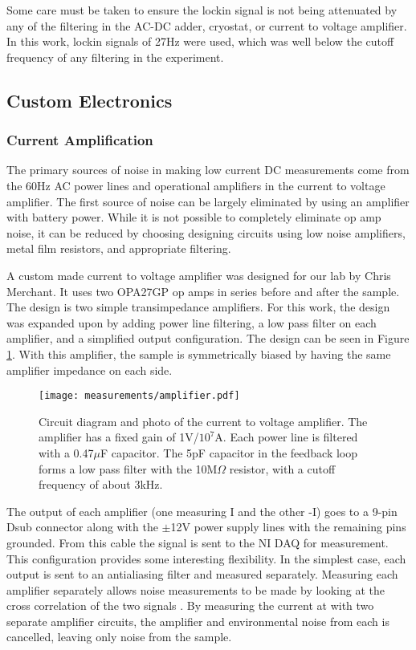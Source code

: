 Some care must be taken to ensure the lockin signal is not being attenuated by any of the filtering in the AC-DC adder, cryostat, or current to voltage amplifier.  In this work, lockin signals of 27Hz were used, which was well below the cutoff frequency of any filtering in the experiment.

\subsection{Custom Electronics}

\subsubsection*{Current Amplification}
\label{sec:CV_amp}

The primary sources of noise in making low current DC measurements come from the 60Hz AC power lines and operational amplifiers in the current to voltage amplifier. The first source of noise can be largely eliminated by using an amplifier with battery power. While it is not possible to completely eliminate op amp noise, it can be reduced by choosing designing circuits using low noise amplifiers, metal film resistors, and appropriate filtering. 

A custom made current to voltage amplifier was designed for our lab by Chris Merchant. It uses two OPA27GP op amps in series before and after the sample. The design is two simple transimpedance amplifiers. For this work, the design was expanded upon by adding power line filtering, a low pass filter on each amplifier, and a simplified output configuration. The design can be seen in Figure \ref{fig:current_amp}. With this amplifier, the sample is symmetrically biased by having the same amplifier impedance on each side.

\begin{figure}
    \centering
    \texttt{[image: measurements/amplifier.pdf]}
    \caption{Circuit diagram and photo of the current to voltage amplifier. The amplifier has a fixed gain of 1V/$10^7$A. Each power line is filtered with a 0.47$\mu$F capacitor. The 5pF capacitor in the feedback loop forms a low pass filter with the 10M$\Omega$ resistor, with a cutoff frequency of about 3kHz.}
    \label{fig:current_amp}
\end{figure}

The output of each amplifier (one measuring I and the other -I) goes to a 9-pin Dsub connector along with the $\pm$12V power supply lines with the remaining pins grounded. From this cable the signal is sent to the NI DAQ for measurement. This configuration provides some interesting flexibility. In the simplest case, each output is sent to an antialiasing filter and measured separately. Measuring each amplifier separately allows noise measurements to be made by looking at the cross correlation of the two signals \cite{Merchant2009}. By measuring the current at with two separate amplifier circuits, the amplifier and environmental noise from each is cancelled, leaving only noise from the sample.

